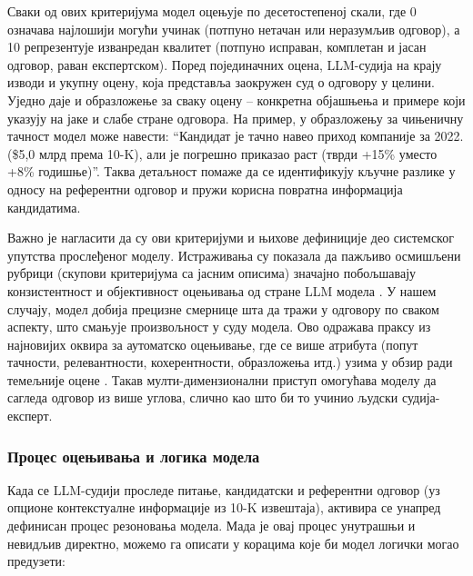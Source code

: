 Сваки од ових критеријума модел оцењује по десетостепеној скали, где 0 означава најлошији могући учинак (потпуно нетачан или неразумљив одговор), а 10 репрезентује изванредан квалитет (потпуно исправан, комплетан и јасан одговор, раван експертском). Поред појединачних оцена, LLM-судија на крају изводи и укупну оцену, која представља заокружен суд о одговору у целини. Уједно даје и образложење за сваку оцену -- конкретна објашњења и примере који указују на јаке и слабе стране одговора. На пример, у образложењу за чињеничну тачност модел може навести: ``Кандидат је тачно навео приход компаније за 2022. (\$5,0 млрд према 10-K), али је погрешно приказао раст (тврди +15\% уместо +8\% годишње)''. Таква детаљност помаже да се идентификују кључне разлике у односу на референтни одговор и пружи корисна повратна информација кандидатима.

Важно је нагласити да су ови критеријуми и њихове дефиниције део системског упутства прослеђеног моделу. Истраживања су показала да пажљиво осмишљени рубрици (скупови критеријума са јасним описима) значајно побољшавају конзистентност и објективност оцењивања од стране LLM модела \cite{zheng_judging_llm_2023}. У нашем случају, модел добија прецизне смернице шта да тражи у одговору по сваком аспекту, што смањује произвољност у суду модела. Ово одражава праксу из најновијих оквира за аутоматско оцењивање, где се више атрибута (попут тачности, релевантности, кохерентности, образложења итд.) узима у обзир ради темељније оцене \cite{verga_replacing_judges_2024}. Такав мулти-димензионални приступ омогућава моделу да сагледа одговор из више углова, слично као што би то учинио људски судија-експерт.

\subsubsection{Процес оцењивања и логика модела}

Када се LLM-судији проследе питање, кандидатски и референтни одговор (уз опционе контекстуалне информације из 10-K извештаја), активира се унапред дефинисан процес резоновања модела. Мада је овај процес унутрашњи и невидљив директно, можемо га описати у корацима које би модел логички могао предузети:

